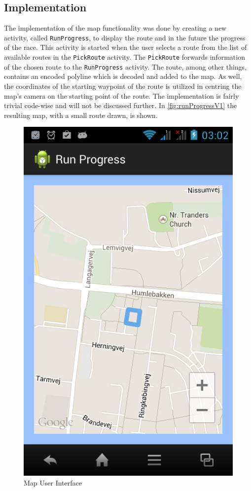 \subsection{Implementation}
The implementation of the map functionality was done by creating a new activity, called \texttt{RunProgress}, to display the route and in the future the progress of the race. This activity is started when the user selects a route from the list of available routes in the \texttt{PickRoute} activity. The \texttt{PickRoute} forwards information of the chosen route to the \texttt{RunProgress} activity. The route, among other things, contains an encoded polyline which is decoded and added to the map. As well, the coordinates of the starting waypoint of the route is utilized in centring the map's camera on the starting point of the route. The implementation is fairly trivial code-wise and will not be discussed further. In \autoref{fig:runProgressV1} the resulting map, with a small route drawn, is shown.

\begin{figure}[!ht]
	\begin{center}
		\includegraphics[scale=0.4]{img/runProgressV1.png}
		\caption{Map User Interface}
		\label{fig:runProgressV1}
	\end{center}
\end{figure}

